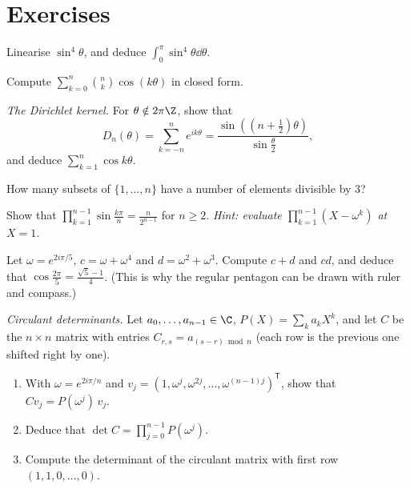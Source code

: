 
\section{Exercises}

\begin{exercise}[$\star$]\label{ex:lin}
Linearise $\sin^4\theta$, and deduce $\displaystyle\int_0^{\pi}\sin^4\theta\dd\theta$.
\end{exercise}

\begin{exercise}[$\star$]\label{ex:binomcos}
Compute $\displaystyle\sum_{k=0}^n\binom nk\cos(k\theta)$ in closed form.
\end{exercise}

\begin{exercise}[$\star\star$]\label{ex:dirichlet}
\emph{The Dirichlet kernel.} For $\theta\notin2\pi\Z$, show that
\[
D_n(\theta)=\sum_{k=-n}^ne^{ik\theta}=\frac{\sin\left((n+\frac12)\theta\right)}{\sin\frac\theta2},
\]
and deduce $\displaystyle\sum_{k=1}^n\cos k\theta$.
\end{exercise}

\begin{exercise}[$\star\star$]\label{ex:mod3}
How many subsets of $\{1,\dots,n\}$ have a number of elements divisible by $3$?
\end{exercise}

\begin{exercise}[$\star\star$]\label{ex:sines}
Show that $\displaystyle\prod_{k=1}^{n-1}\sin\frac{k\pi}n=\frac n{2^{n-1}}$ for $n\ge2$.
\emph{Hint: evaluate $\prod_{k=1}^{n-1}(X-\omega^k)$ at $X=1$.}
\end{exercise}

\begin{exercise}[$\star\star$]\label{ex:pentagon}
Let $\omega=e^{2i\pi/5}$, $c=\omega+\omega^4$ and $d=\omega^2+\omega^3$. Compute $c+d$ and $cd$, and deduce that
$\cos\frac{2\pi}5=\frac{\sqrt5-1}4$. (This is why the regular pentagon can be drawn with ruler and compass.)
\end{exercise}

\begin{exercise}[$\star\star\star$]\label{ex:circulant}
\emph{Circulant determinants.} Let $a_0,\dots,a_{n-1}\in\C$, $P(X)=\sum_ka_kX^k$, and let $C$ be the $n\times n$ matrix
with entries $C_{r,s}=a_{(s-r)\bmod n}$ (each row is the previous one shifted right by one).
\begin{enumerate}[label=(\alph*)]
\item With $\omega=e^{2i\pi/n}$ and $v_j=\left(1,\omega^j,\omega^{2j},\dots,\omega^{(n-1)j}\right)^{\mathsf T}$, show that $Cv_j=P(\omega^j)\,v_j$.
\item Deduce that $\det C=\prod_{j=0}^{n-1}P(\omega^j)$.
\item Compute the determinant of the circulant matrix with first row $(1,1,0,\dots,0)$.
\end{enumerate}
\end{exercise}

